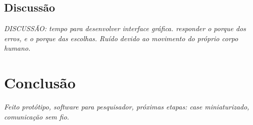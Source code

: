 	\section{Discussão}		
	\textit{DISCUSSÃO: tempo para desenvolver interface gráfica. responder o porque dos erros, e o porque das escolhas. Ruído devido ao movimento do próprio corpo humano. 	
	}
\chapter{Conclusão}
	
	\textit{Feito protótipo, software para pesquisador, próximas etapas: case miniaturizado, comunicação sem fio.}
